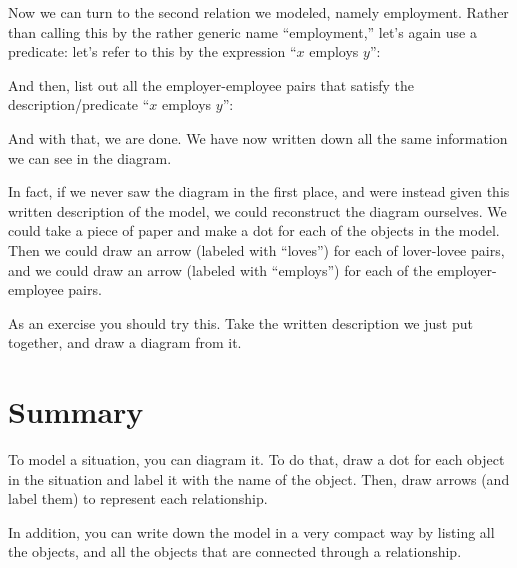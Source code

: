 \documentclass[../../../main.tex]{subfiles}
\begin{document}
\noindent
Now we can turn to the second relation we modeled, namely employment. Rather than calling this by the rather generic name ``employment,'' let's again use a predicate: let's refer to this by the expression ``$x$ employs $y$'':


\begin{model}
\end{model}

\noindent
And then, list out all the employer-employee pairs that satisfy the description/predicate ``$x$ employs $y$'':

\begin{model}
\end{model}

\noindent
And with that, we are done. We have now written down all the same information we can see in the diagram. 

In fact, if we never saw the diagram in the first place, and were instead given this written description of the model, we could reconstruct the diagram ourselves. We could take a piece of paper and make a dot for each of the objects in the model. Then we could draw an arrow (labeled with ``loves'') for each of lover-lovee pairs, and we could draw an arrow (labeled with ``employs'') for each of the employer-employee pairs.

As an exercise you should try this. Take the written description we just put together, and draw a diagram from it.


\section{Summary}

To model a situation, you can diagram it. To do that, draw a dot for each object in the situation and label it with the name of the object. Then, draw arrows (and label them) to represent each relationship.

In addition, you can write down the model in a very compact way by listing all the objects, and all the objects that are connected through a relationship.
\end{document}
